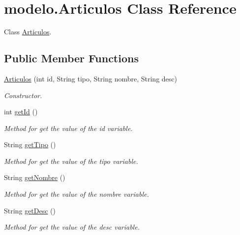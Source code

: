 \hypertarget{classmodelo_1_1_articulos}{}\section{modelo.\+Articulos Class Reference}
\label{classmodelo_1_1_articulos}


Class \mbox{\hyperlink{classmodelo_1_1_articulos}{Articulos}}.  


\subsection*{Public Member Functions}
\begin{DoxyCompactItemize}
\item 
\mbox{\hyperlink{classmodelo_1_1_articulos_a520b1e25e7c87ed796ec2ac0db85475c}{Articulos}} (int id, String tipo, String nombre, String desc)
\begin{DoxyCompactList}\small\item\em Constructor. \end{DoxyCompactList}\item 
int \mbox{\hyperlink{classmodelo_1_1_articulos_a4784500f94b55f2cf7ed8670bf15a6ca}{get\+Id}} ()
\begin{DoxyCompactList}\small\item\em Method for get the value of the id variable. \end{DoxyCompactList}\item 
String \mbox{\hyperlink{classmodelo_1_1_articulos_a894f705611372b68e0bb520350626983}{get\+Tipo}} ()
\begin{DoxyCompactList}\small\item\em Method for get the value of the tipo variable. \end{DoxyCompactList}\item 
String \mbox{\hyperlink{classmodelo_1_1_articulos_a7782939b3b47698ff92e5349c6558b17}{get\+Nombre}} ()
\begin{DoxyCompactList}\small\item\em Method for get the value of the nombre variable. \end{DoxyCompactList}\item 
String \mbox{\hyperlink{classmodelo_1_1_articulos_ade935cf80e8c5e30bbbc31df6f1ea13a}{get\+Desc}} ()
\begin{DoxyCompactList}\small\item\em Method for get the value of the desc variable. \end{DoxyCompactList}\end{DoxyCompactItemize}


